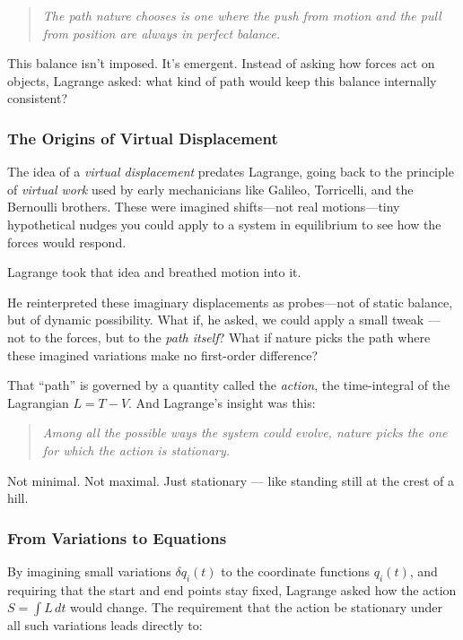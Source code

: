 \begin{quote}
    \textit{The path nature chooses is one where the push from motion and the pull from position are always in perfect balance.}
\end{quote}

This balance isn’t imposed. It’s emergent. Instead of asking how forces act on objects, Lagrange asked: what kind of path would keep this balance internally consistent?

\subsubsection{The Origins of Virtual Displacement}

The idea of a \textit{virtual displacement} predates Lagrange, going back to the principle of \textit{virtual work} used by early mechanicians like Galileo, Torricelli, and the Bernoulli brothers. These were imagined shifts—not real motions—tiny hypothetical nudges you could apply to a system in equilibrium to see how the forces would respond.

Lagrange took that idea and breathed motion into it.

He reinterpreted these imaginary displacements as probes—not of static balance, but of dynamic possibility. What if, he asked, we could apply a small tweak — not to the forces, but to the \textit{path itself}? What if nature picks the path where these imagined variations make no first-order difference?

That “path” is governed by a quantity called the \textit{action}, the time-integral of the Lagrangian \( L = T - V \). And Lagrange’s insight was this:

\begin{quote}
\textit{Among all the possible ways the system could evolve, nature picks the one for which the action is stationary.}
\end{quote}

Not minimal. Not maximal. Just stationary — like standing still at the crest of a hill.

\subsubsection{From Variations to Equations}

By imagining small variations \( \delta q_i(t) \) to the coordinate functions \( q_i(t) \), and requiring that the start and end points stay fixed, Lagrange asked how the action \( S = \int L\,dt \) would change. The requirement that the action be stationary under all such variations leads directly to:

